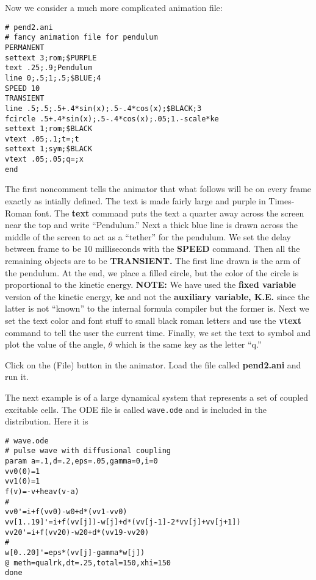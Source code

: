 \documentclass{article}
\begin{document}
Now we consider a much more complicated animation file:
\begin{verbatim}
# pend2.ani
# fancy animation file for pendulum
PERMANENT
settext 3;rom;$PURPLE
text .25;.9;Pendulum
line 0;.5;1;.5;$BLUE;4
SPEED 10
TRANSIENT
line .5;.5;.5+.4*sin(x);.5-.4*cos(x);$BLACK;3
fcircle .5+.4*sin(x);.5-.4*cos(x);.05;1.-scale*ke
settext 1;rom;$BLACK
vtext .05;.1;t=;t
settext 1;sym;$BLACK
vtext .05;.05;q=;x
end
\end{verbatim}

The first noncomment tells the animator that what follows will be on
every frame exactly as intially defined. The text is made fairly large
and purple in Times-Roman font. The {\bf text} command puts the text a
quarter away across the screen near the top and write ``Pendulum.''
Next a thick blue line is drawn across the middle of the screen to act
as a ``tether'' for the pendulum.  We set the delay between frame to
be 10 milliseconds with the {\bf SPEED} command.  Then all the
remaining objects are to be {\bf TRANSIENT.} The first line drawn is
the arm of the pendulum. At the end, we place a filled circle, but the
color of the circle is proportional to the kinetic energy. {\bf NOTE:}
We have used the {\bf fixed variable} version of the kinetic energy,
{\bf ke}  and
not the {\bf auxiliary variable, K.E.} since the latter is not
``known'' to the internal formula compiler but the former is.
Next we set the text color and font stuff to small black roman letters
and use the {\bf vtext} command to tell the user the current
time. Finally, we set the text to symbol and plot the value of the
angle, $\theta$ which is the same key as the letter ``q.'' 

Click on the (File) button in the animator. Load the file called {\bf
pend2.ani} and run it. 

\medskip 

The next example is of a large dynamical system that represents a set
of coupled excitable cells. The ODE file is called {\tt wave.ode} and
is included in the distribution. Here it is
\begin{verbatim}
# wave.ode
# pulse wave with diffusional coupling 
param a=.1,d=.2,eps=.05,gamma=0,i=0
vv0(0)=1
vv1(0)=1
f(v)=-v+heav(v-a)
#
vv0'=i+f(vv0)-w0+d*(vv1-vv0)
vv[1..19]'=i+f(vv[j])-w[j]+d*(vv[j-1]-2*vv[j]+vv[j+1])
vv20'=i+f(vv20)-w20+d*(vv19-vv20)
#
w[0..20]'=eps*(vv[j]-gamma*w[j])
@ meth=qualrk,dt=.25,total=150,xhi=150
done
\end{verbatim}
\end{document}
